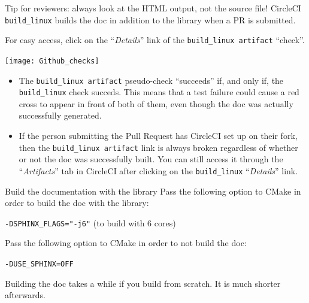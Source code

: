\documentclass[8pt]{beamer}
\begin{document}
\begin{frame}{Tip for reviewers: always look at the HTML output, not the source file!}
CircleCI \texttt{build\_linux} builds the doc in addition to the library when a PR is submitted.

For easy access, click on the ``\alert{\emph{Details}}'' link of the \texttt{build\_linux artifact} ``check''.

\texttt{[image: Github\_checks]}

\begin{itemize}
    \item The \texttt{build\_linux artifact} pseudo-check ``succeeds'' if, and only if, the \texttt{build\_linux} check succeds.
    This means that a test failure could cause a red cross to appear in front of both of them, even though the doc was actually successfully generated.
    \item If the person submitting the Pull Request has CircleCI set up on their fork, then the \texttt{build\_linux artifact} link is always broken regardless of whether or not the doc was successfully built. You can still access it through the ``\alert{\emph{Artifacts}}'' tab in CircleCI after clicking on the \texttt{build\_linux} ``\alert{\emph{Details}}'' link.
\end{itemize}
\end{frame}


\begin{frame}{Build the documentation with the library}
    Pass the following option to \alert{CMake} in order to build the doc with the library:
    
    \texttt{-DSPHINX\_FLAGS="-j6"} (to build with 6 cores)

    Pass the following option to \alert{CMake} in order to \alert{not} build the doc:
    
    \texttt{-DUSE\_SPHINX=OFF}

    Building the doc takes a while if you build from scratch. It is much shorter afterwards.
\end{frame}


\end{document}
